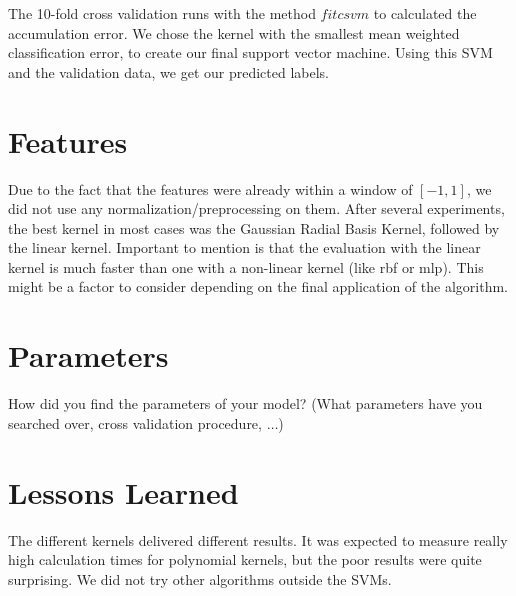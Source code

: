 \documentclass[a4paper, 11pt]{article}
\begin{document}
The 10-fold cross validation runs with the method $fitcsvm$ to calculated the accumulation error. We chose the kernel with the smallest mean weighted classification error, to create our final support vector machine.
Using this SVM and the validation data, we get our predicted labels.

\section{Features}

Due to the fact that the features were already within a window of $[-1,1]$, we did not use any normalization/preprocessing on them. After several experiments, the best kernel in most cases was the Gaussian Radial Basis Kernel, followed by the linear kernel. Important to mention is that the evaluation with the linear kernel is much faster than one with a non-linear kernel (like rbf or mlp). This might be a factor to consider depending on the final application of the algorithm.

\section{Parameters}
How did you find the parameters of your model? (What parameters have you searched over, cross validation procedure, $\ldots$)


\section{Lessons Learned} 

The different kernels delivered different results. It was expected to measure really high calculation times for polynomial kernels, but the poor results were quite surprising.
We did not try other algorithms outside the SVMs.


\end{document}
